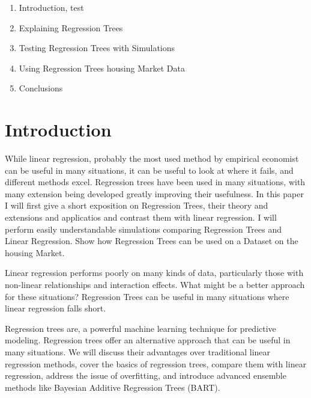 \documentclass[12pt]{article}
\begin{document}
\onehalfspacing                  	




\begin{enumerate}
    \item Introduction, test
    \item Explaining Regression Trees
    \item Testing Regression Trees with Simulations
    \item Using Regression Trees housing Market Data
    \item Conclusions
\end{enumerate}


\section{Introduction}
While linear regression, probably the most used method by empirical economist can be useful in many situations, it can be useful to look at where it fails, and different methods excel. Regression trees have been used in many situations, with many extension being developed greatly improving their usefulness. In this paper I will first give a short exposition on Regression Trees, their theory and extensions and applicatios and contrast them with linear regression. I will perform easily understandable simulations comparing Regression Trees and Linear Regression. Show how Regression Trees can be used on a Dataset on the housing Market.



Linear regression performs poorly on many kinds of data, particularly those with non-linear relationships and interaction effects. What might be a better approach for these situations? Regression Trees can be useful in many situations where linear regression falls short.

Regression trees are, a powerful machine learning technique for predictive modeling. Regression trees offer an alternative approach that can be useful in many situations. We will discuss their advantages over traditional linear regression methods, cover the basics of regression trees, compare them with linear regression, address the issue of overfitting, and introduce advanced ensemble methods like Bayesian Additive Regression Trees (BART).
\end{document}
